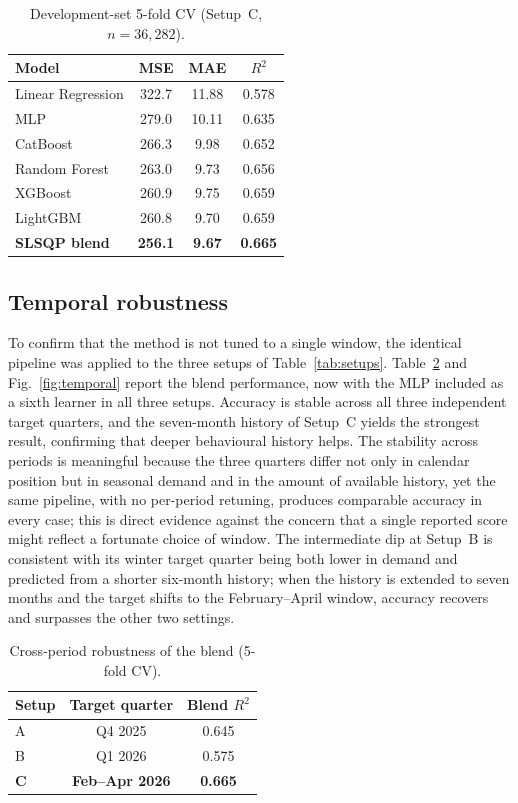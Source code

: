 \documentclass[review,12pt]{elsarticle}
\begin{document}
\begin{table}[!t]
\caption{Development-set 5-fold CV (Setup~C, $n=36{,}282$).}
\label{tab:devcv}
\centering
\begin{tabular}{lccc}
\toprule
Model & MSE & MAE & $R^2$ \\
\midrule
Linear Regression & 322.7 & 11.88 & 0.578 \\
MLP & 279.0 & 10.11 & 0.635 \\
CatBoost & 266.3 & 9.98 & 0.652 \\
Random Forest & 263.0 & 9.73 & 0.656 \\
XGBoost & 260.9 & 9.75 & 0.659 \\
LightGBM & 260.8 & 9.70 & 0.659 \\
\textbf{SLSQP blend} & \textbf{256.1} & \textbf{9.67} & \textbf{0.665} \\
\bottomrule
\end{tabular}
\end{table}

\subsection{Temporal robustness}
To confirm that the method is not tuned to a single window, the identical pipeline
was applied to the three setups of Table~\ref{tab:setups}.
Table~\ref{tab:temporal} and Fig.~\ref{fig:temporal} report the blend performance,
now with the MLP included as a sixth learner in all three setups.
Accuracy is stable across all three independent target quarters, and the
seven-month history of Setup~C yields the strongest result, confirming that deeper
behavioural history helps. The stability across periods is meaningful because the
three quarters differ not only in calendar position but in seasonal demand and in
the amount of available history, yet the same pipeline, with no per-period
retuning, produces comparable accuracy in every case; this is direct evidence
against the concern that a single reported score might reflect a fortunate choice
of window. The intermediate dip at Setup~B is consistent with its winter target
quarter being both lower in demand and predicted from a shorter six-month history;
when the history is extended to seven months and the target shifts to the
February--April window, accuracy recovers and surpasses the other two settings.

\begin{table}[!t]
\caption{Cross-period robustness of the blend (5-fold CV).}
\label{tab:temporal}
\centering
\begin{tabular}{lcc}
\toprule
Setup & Target quarter & Blend $R^2$ \\
\midrule
A & Q4 2025 & 0.645 \\
B & Q1 2026 & 0.575 \\
\textbf{C} & \textbf{Feb--Apr 2026} & \textbf{0.665} \\
\bottomrule
\end{tabular}
\end{table}
\end{document}
